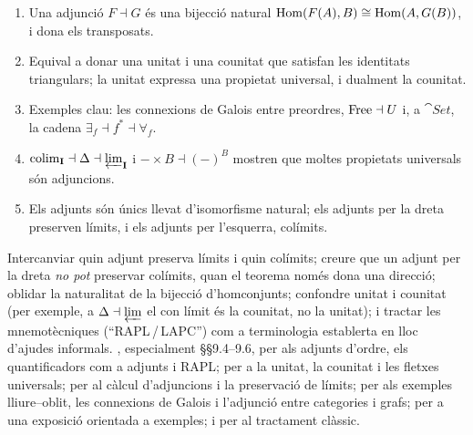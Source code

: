 \begin{resumcap}
\begin{enumerate}
  \item Una adjunció $F\dashv G$ és una bijecció natural $\operatorname{Hom}(F(A),B)\cong\operatorname{Hom}(A,G(B))$, i dona els transposats.
  \item Equival a donar una unitat i una counitat que satisfan les identitats triangulars; la unitat expressa una propietat universal, i dualment la counitat.
  \item Exemples clau: les connexions de Galois entre preordres, $\operatorname{Free}\dashv U$ i, a $\cat{Set}$, la cadena $\exists_f\dashv f^{*}\dashv\forall_f$.
  \item $\operatorname*{colim}_{\mathbf{I}}\dashv\Delta\dashv\varprojlim_{\mathbf{I}}$ i $-\times B\dashv(-)^{B}$ mostren que moltes propietats universals són adjuncions.
  \item Els adjunts són únics llevat d'isomorfisme natural; els adjunts per la dreta preserven límits, i els adjunts per l'esquerra, colímits.
\end{enumerate}
 Intercanviar quin adjunt preserva límits i quin colímits; creure que un adjunt per la dreta \emph{no pot} preservar colímits, quan el teorema només dona una direcció; oblidar la naturalitat de la bijecció d'homconjunts; confondre unitat i counitat (per exemple, a $\Delta\dashv\varprojlim$ el con límit és la counitat, no la unitat); i tractar les mnemotècniques (\enquote{RAPL\,/\,LAPC}) com a terminologia establerta en lloc d'ajudes informals.
 \cite[cap.~9]{awodey}, especialment §§9.4--9.6, per als adjunts d'ordre, els quantificadors com a adjunts i RAPL; \cite[cap.~2]{leinster} per a la unitat, la counitat i les fletxes universals; \cite[§§4.1--4.5]{riehl} per al càlcul d'adjuncions i la preservació de límits; \cite[cap.~4]{perrone-notes} per als exemples lliure--oblit, les connexions de Galois i l'adjunció entre categories i grafs; \cite[cap.~13]{barrwells} per a una exposició orientada a exemples; i \cite[cap.~IV]{maclane} per al tractament clàssic.
\end{resumcap}
